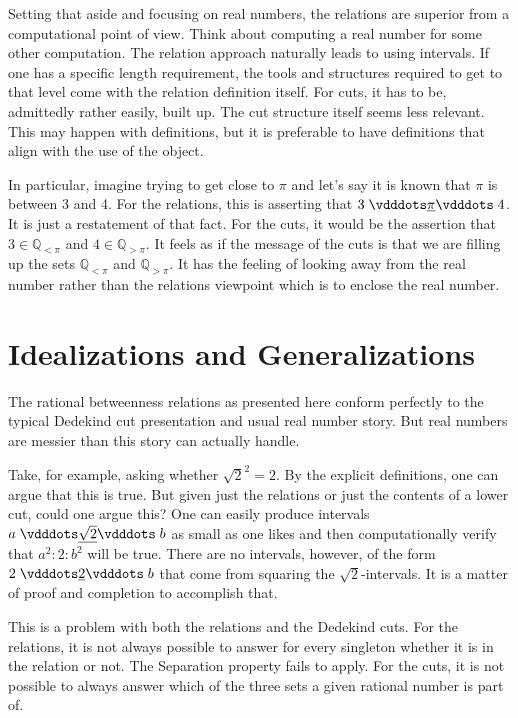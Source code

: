 \documentclass{rmj-public}
\newcommand{\qcut}[2][x]{\ensuremath{\mathbb{Q}_{#2 #1}}}
\newcommand{\qlt}[1][x]{\qcut[#1]{<}}
\newcommand{\qgt}[1][x]{\qcut[#1]{>}}
\begin{document}
Setting that aside and focusing on real numbers, the relations are superior from a computational point of view. Think about computing a real number for some other computation. The relation approach naturally leads to using intervals. If one has a specific length requirement, the tools and structures required to get to that level come with the relation definition itself. For cuts, it has to be, admittedly rather easily, built up. The cut structure itself seems less relevant. This may happen with definitions, but it is preferable to have definitions that align with the use of the object. 

In particular, imagine trying to get close to $\pi$ and let's say it is known that $\pi$ is between 3 and 4. For the relations, this is asserting that $3 \xrel[\pi] 4$. It is just a restatement of that fact. For the cuts, it would be the assertion that $3 \in \qlt[\pi]$ and $4 \in \qgt[\pi]$. It feels as if the message of the cuts is that we are filling up the sets $\qlt[\pi]$ and $\qgt[\pi]$. It has the feeling of looking away from the real number rather than the relations viewpoint which is to enclose the real number. 


\section{Idealizations and Generalizations}

The rational betweenness relations as presented here conform perfectly to the typical Dedekind cut presentation and usual real number story. But real numbers are messier than this story can actually handle. 

Take, for example, asking whether $\sqrt{2}^2 = 2$. By the explicit definitions, one can argue that this is true. But given just the relations or just the contents of a lower cut, could one argue this? One can easily produce intervals $a \xrel[\sqrt{2}] b$ as small as one likes and then computationally verify that $a^2 : 2 :b^2$ will be true. There are no intervals, however, of the form $2 \xrel[2] b$ that come from squaring the $\sqrt{2}$-intervals. It is a matter of proof and completion to accomplish that. 

This is a problem with both the relations and the Dedekind cuts. For the relations, it is not always possible to answer for every singleton whether it is in the relation or not. The Separation property fails to apply. For the cuts, it is not possible to always answer which of the three sets a given rational number is part of. 
\end{document}
